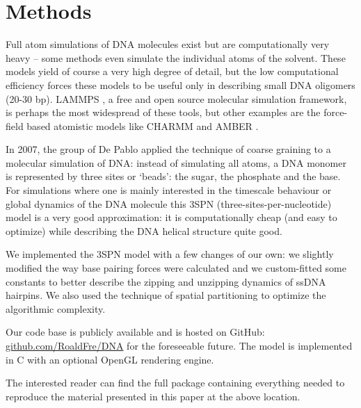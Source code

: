 \section{Methods}

Full atom simulations of DNA molecules exist but are computationally very heavy -- some methods even simulate the individual atoms of the solvent. These models yield of course a very high degree of detail, but the low computational efficiency forces these models to be useful only in describing small DNA oligomers (20-30 bp). LAMMPS \cite{plimpton2007lammps}, a free and open source molecular simulation framework, is perhaps the most widespread of these tools, but other examples are the force-field based atomistic models like CHARMM \cite{brooks2009charmm} and AMBER \cite{cheatham1999modified}.

In 2007, the group of De Pablo \cite{knotts2007coarse} applied the technique of coarse graining to a molecular simulation of DNA: instead of simulating all atoms, a DNA monomer is represented by three sites or `beads': the sugar, the phosphate and the base. For simulations where one is mainly interested in the timescale behaviour or global dynamics of the DNA molecule this 3SPN (three-sites-per-nucleotide) model is a very good approximation: it is computationally cheap (and easy to optimize) while describing the DNA helical structure quite good. 

We implemented the 3SPN model with a few changes of our own: we slightly modified the way base pairing forces were calculated and we custom-fitted some constants to better describe the zipping and unzipping dynamics of ssDNA hairpins. We also used the technique of spatial partitioning to optimize the algorithmic complexity.

Our code base is publicly available and is hosted on GitHub: \href{https://github.com/RoaldFre/DNA}{github.com/RoaldFre/DNA} for the foreseeable future. The model is implemented in C with an optional OpenGL rendering engine.

The interested reader can find the full package containing everything needed to reproduce the material presented in this paper at the above location.











